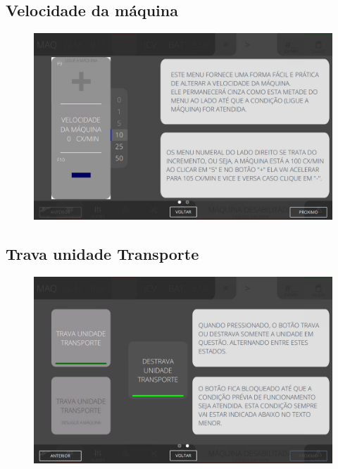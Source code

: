 \thispagestyle{fancy}
\vspace{\fill}
\subsection{Velocidade da máquina}
\begin{figure}
    \centering
    \includegraphics[width=480 px,height=300 px]{src/imagesICV/05-transport/commands/e-1.png}
\end{figure}

\newpage
\thispagestyle{fancy}
\vspace{\fill}
\subsection{Trava unidade Transporte}
\begin{figure}
    \centering
    \includegraphics[width=576 px,height=360 px]{src/imagesICV/05-transport/commands/e-2.png}
\end{figure}